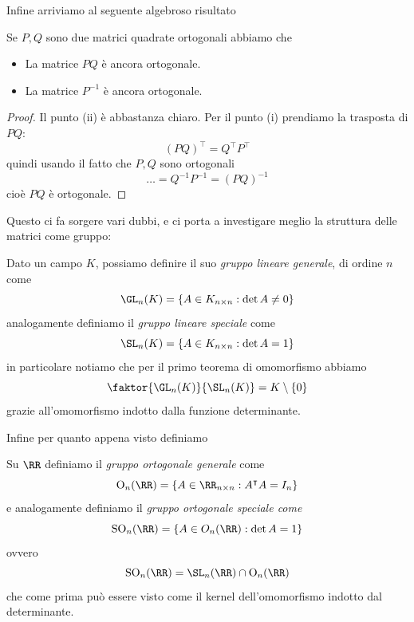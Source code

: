 \documentclass[11pt]{scrartcl}
\begin{document}
   	 Infine arriviamo al seguente algebroso risultato
   	 \begin{lemma}
   	 	Se $P,Q$ sono due matrici quadrate ortogonali abbiamo che
   	 	\begin{itemize}
   	 		\item[(i)] La matrice $PQ$ è ancora ortogonale.
   	 		\item[(ii)] La matrice $P^{-1}$ è ancora ortogonale.
   	 	\end{itemize}
   	 \end{lemma}
   	 \begin{proof}
   	 	Il punto (ii) è abbastanza chiaro. Per il punto (i) prendiamo la trasposta di $PQ$:
   	 	$$(PQ)^\intercal=Q^\intercal P^\intercal$$
   	 	quindi usando il fatto che $P,Q$ sono ortogonali
   	 	$$\dots = Q^{-1}P^{-1}=\left(PQ\right)^{-1}$$
   	 	cioè $PQ$ è ortogonale.
   	 \end{proof}
   	 Questo ci fa sorgere vari dubbi, e ci porta a investigare meglio la struttura delle matrici come gruppo:
   	 \begin{definition}
   	 	Dato un campo $K$, possiamo definire il suo \textit{gruppo lineare generale}, di ordine $n$ come
   	 	$$\GL_n(K)=\left\{A\in K_{n\times n}:\det A \ne 0\right\}$$
   	 	analogamente definiamo il \textit{gruppo lineare speciale} come
   	 	$$\SL_n(K)=\left\{A\in K_{n\times n}:\det A =1\right\}$$
   	 	in particolare notiamo che per il primo teorema di omomorfismo abbiamo
   	 	$$\faktor{\GL_n(K)}{\SL_n(K)}=K\setminus \left\{0\right\}$$
   	 	grazie all'omomorfismo indotto dalla funzione determinante. 
   	 \end{definition}
   	 Infine per quanto appena visto definiamo
   	 \begin{definition}
   	 	Su $\RR$ definiamo il \textit{gruppo ortogonale generale} come
   	 	$$\text{O}_n(\RR)=\left\{A\in \RR_{n\times n}:A^\intercal A = I_n\right\}$$
   	 	e analogamente definiamo il \textit{gruppo ortogonale speciale come}
   	 	$$\text{SO}_n(\RR)=\left\{A\in O_n(\RR):\det A = 1\right\}$$
   	 	ovvero
   	 	$$\text{SO}_n(\RR)=\SL_n(\RR)\cap \text{O}_n(\RR)$$
   	 	che come prima può essere visto come il kernel dell'omomorfismo indotto dal determinante. 
   	 \end{definition}
\end{document}
